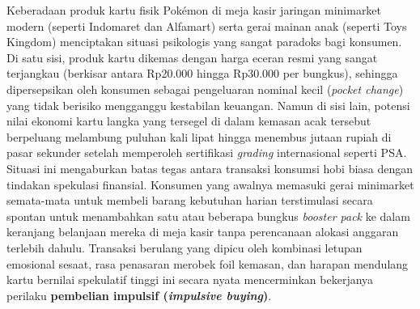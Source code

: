 \documentclass[12pt,a4paper]{article}
\numberwithin{equation}{section}
\numberwithin{table}{section}
\numberwithin{figure}{section}
\begin{document}
Keberadaan produk kartu fisik Pok\'emon di meja kasir jaringan minimarket modern (seperti Indomaret dan Alfamart) serta gerai mainan anak (seperti Toys Kingdom) menciptakan situasi psikologis yang sangat paradoks bagi konsumen. Di satu sisi, produk kartu dikemas dengan harga eceran resmi yang sangat terjangkau (berkisar antara Rp20.000 hingga Rp30.000 per bungkus), sehingga dipersepsikan oleh konsumen sebagai pengeluaran nominal kecil (\emph{pocket change}) yang tidak berisiko mengganggu kestabilan keuangan. Namun di sisi lain, potensi nilai ekonomi kartu langka yang tersegel di dalam kemasan acak tersebut berpeluang melambung puluhan kali lipat hingga menembus jutaan rupiah di pasar sekunder setelah memperoleh sertifikasi \emph{grading} internasional seperti PSA. Situasi ini mengaburkan batas tegas antara transaksi konsumsi hobi biasa dengan tindakan spekulasi finansial. Konsumen yang awalnya memasuki gerai minimarket semata-mata untuk membeli barang kebutuhan harian terstimulasi secara spontan untuk menambahkan satu atau beberapa bungkus \emph{booster pack} ke dalam keranjang belanjaan mereka di meja kasir tanpa perencanaan alokasi anggaran terlebih dahulu. Transaksi berulang yang dipicu oleh kombinasi letupan emosional sesaat, rasa penasaran merobek foil kemasan, dan harapan mendulang kartu bernilai spekulatif tinggi ini secara nyata mencerminkan bekerjanya perilaku \textbf{pembelian impulsif (\emph{impulsive buying})}.
\end{document}

